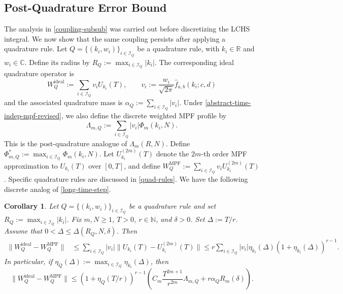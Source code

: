 \documentclass[10pt,reqno]{article}
\numberwithin{equation}{section}
\theoremstyle{plain}
\newtheorem{cor}[thm]{Corollary}
\theoremstyle{definition}
\begin{document}
\subsection{Post-Quadrature Error Bound}\label{quadrature-error}
The analysis in \cref{coupling-subsub} was carried out before discretizing the LCHS integral. We now show that the same coupling persists after applying a quadrature rule. Let $Q=\{(k_i,w_i)\}_{i\in\mathcal I_Q}$ be a quadrature rule, with $k_i\in\mathbb R$ and $w_i\in\mathbb C$. Define its radius by $R_Q:=\max_{i\in\mathcal I_Q}|k_i|$.
The corresponding ideal quadrature operator is
\begin{equation}\label{eq:generic-quadrature-operator}
W_Q^{\mathrm{ideal}} := \sum_{i\in\mathcal I_Q}v_iU_{k_i}(T), \qquad v_i:= \frac{w_i}{\sqrt{2\pi}}\hat f_{a,b}(k_i;c,d)
\end{equation}
and the associated quadrature mass is $\alpha_Q := \sum_{i\in\mathcal I_Q}|v_i|$. Under \cref{abstract-time-indep-mpf-revised}, we also define the discrete weighted MPF profile by
\begin{equation}\label{eq:Lambda-Q}
\Lambda_{m,Q} := \sum_{i\in\mathcal I_Q}|v_i|\Phi_m(k_i,N).
\end{equation}
This is the post-quadrature analogue of \(\Lambda_m(R,N)\). Define \(\Phi_{m,Q}^\ast:=\max_{i\in\mathcal I_Q}\Phi_m(k_i,N)\). Let \(U_{k_i}^{(2m)}(T)\) denote the \(2m\)-th order MPF approximation to \(U_{k_i}(T)\) over \([0,T]\), and define
$W_Q^{\mathrm{MPF}} := \sum_{i\in\mathcal I_Q}v_i U^{(2m)}_{k_i}(T)$. 
Specific quadrature rules are discussed in \cref{quad-rules}. We have the following discrete analog of \cref{long-time-step}.

\begin{cor}\label{discrete-mpf-error}
Let $Q=\{(k_i,w_i)\}_{i\in\mathcal I_Q}$ be a quadrature rule and set $R_Q:=\max_{i\in\mathcal I_Q}|k_i|$. Fix $m,N\ge 1$, $T>0$, $r\in\mathbb N$, and $\delta >0$. Set $\Delta:=T/r$. Assume that $0<\Delta\le \Delta(R_Q,N,\delta)$. Then
\begin{align}
\|W_Q^{\mathrm{ideal}}-W_Q^{\mathrm{MPF}}\| &\le \sum_{i\in\mathcal I_Q}|v_i| \|U_{k_i}(T)-U^{(2m)}_{k_i}(T)\|  \le r\sum_{i\in\mathcal I_Q} |v_i|\eta_{k_i}(\Delta)(1+\eta_{k_i}(\Delta))^{r-1}.
\label{eq:discrete-mpf-error-exact}
\end{align}
In particular, if $\eta_Q(\Delta) := \max_{i\in\mathcal I_Q}\eta_{k_i}(\Delta)$, then
\begin{equation}\label{eq:discrete-mpf-error-bound}
\|W_Q^{\mathrm{ideal}}-W_Q^{\mathrm{MPF}}\| \le (1+\eta_Q(T/r))^{r-1} \left( C_m\frac{T^{2m+1}}{r^{2m}}\Lambda_{m,Q} + r\alpha_QR_m(\delta) \right).
\end{equation}
\end{cor}
\end{document}
